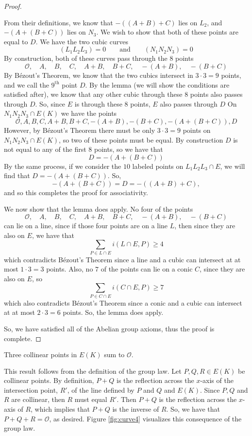 \documentclass[]{../../math_paper}
\begin{document}
\begin{proof}
\begin{enumerate} [label = (\roman*)]
              From their definitions, we know that $-((A + B) + C)$ lies on $L_2$, and $-(A + (B + C))$ lies on $N_3$. We wish to show that both of these points are equal to $D$. We have the two cubic curves
              $$(L_1L_2L_3)= 0 \qquad \text{and} \qquad (N_1N_2N_3) = 0$$
              By construction, both of these curves pass through the $8$ points
              $$\mathcal{O}, \quad A, \quad B, \quad C, \quad A + B, \quad B + C, \quad -(A + B), \quad -(B + C)$$
              By Bézout's Theorem, we know that the two cubics intersect in $3 \cdot 3 = 9$ points, and we call the $9^{\text{th}}$ point $D$. By the lemma (we will show the conditions are satisfied after), we know that any other cubic through these $8$ points also passes through $D$. So, since $E$ is through these $8$ points, $E$ also passes through $D$ On $N_1N_2N_3 \cap E(K)$ we have the points
              $$\mathcal{O}, A, B, C, A+B, B+C, -(A + B), -(B + C), -(A + (B+C)), D$$
              However, by Bézout's Theorem there must be only $3 \cdot 3 = 9$ points on $N_1N_2N_3 \cap E(K)$, so two of these points must be equal. By construction $D$ is not equal to any of the first $8$ points, so we have that
              $$D = -(A + (B + C))$$
              By the same process, if we consider the $10$ labeled points on $L_1L_2L_3 \cap E$, we will find that $D = -(A + (B + C))$. So,
              $$-(A + (B + C)) = D = -((A + B) + C),$$
              and so this completes the proof for associativity.

              We now show that the lemma does apply. No four of the points
              $$\mathcal{O}, \quad A, \quad B, \quad C, \quad A + B, \quad B + C, \quad -(A + B), \quad -(B + C)$$
              can lie on a line, since if those four points are on a line $L$, then since they are also on $E$, we have that $$\sum_{P \in L \cap E}i(L \cap E, P) \geq 4$$
              which contradicts Bézout's Theorem since a line and a cubic can intersect at at most $1 \cdot 3 = 3$ points. Also, no $7$ of the points can lie on a conic $C$, since they are also on $E$, so
              $$\sum_{P \in C \cap E}i(C \cap E, P) \geq 7$$
              which also contradicts Bézout's Theorem since a conic and a cubic can intersect at at most $2 \cdot 3 = 6$ points. So, the lemma does apply.
    \end{enumerate}
    So, we have satisfied all of the Abelian group axioms, thus the proof is complete.
\end{proof}
\begin{example}
    Three collinear points in $E(K)$ sum to $\mathcal{O}$.
\end{example}
This result follows from the definition of the group law. Let $P, Q, R \in E(K)$ be collinear points. By definition, $P + Q$ is the reflection across the $x$-axis of the intersection point, $R'$, of the line defined by $P$ and $Q$ and $E(K)$. Since $P, Q$ and $R$ are collinear, then $R$ must equal $R'$. Then $P + Q$ is the reflection across the $x$-axis of $R$, which implies that $P + Q$ is the inverse of $R$. So, we have that $P + Q + R = \mathcal{O}$, as desired. Figure \ref{fig:curve4} visualizes this consequence of the group law.
\end{document}
